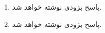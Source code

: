 \p
\begin{enumerate}
\item
پاسخ بزودی نوشته خواهد شد.
\item
پاسخ بزودی نوشته خواهد شد.

\end{enumerate}